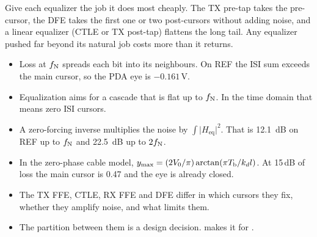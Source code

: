 \begin{insight}
Give each equalizer the job it does most cheaply. The TX pre-tap takes the pre-cursor, the DFE takes the first one or two post-cursors without adding noise, and a linear equalizer (CTLE or TX post-tap) flattens the long tail. Any equalizer pushed far beyond its natural job costs more than it returns.
\end{insight}

\begin{takeaways}
\begin{itemize}
  \item Loss at $f_\mathrm{N}$ spreads each bit into its neighbours. On REF the ISI sum exceeds the main cursor, so the PDA eye is $-0.161$\,V.
  \item Equalization aims for a cascade that is flat up to $f_\mathrm{N}$. In the time domain that means zero ISI cursors.
  \item A zero-forcing inverse multiplies the noise by $\int\lvert H_\mathrm{eq}\rvert^2$. That is \qty{12.1}{\deci\bel} on REF up to $f_\mathrm{N}$ and \qty{22.5}{\deci\bel} up to $2f_\mathrm{N}$.
  \item In the zero-phase cable model, $y_{\max}=(2V_0/\pi)\arctan(\pi T_\mathrm{b}/k_dl)$. At 15\,dB of loss the main cursor is 0.47 and the eye is already closed.
  \item The TX FFE, CTLE, RX FFE and DFE differ in which cursors they fix, whether they amplify noise, and what limits them.
  \item The partition between them is a design decision.  makes it for \OS{}.
\end{itemize}
\end{takeaways}
